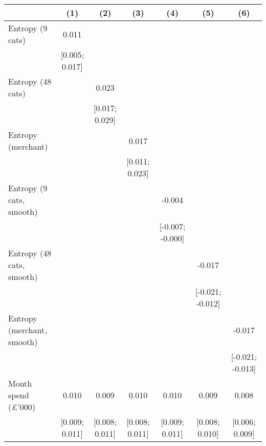 
\begingroup
\centering
\begin{tabular}{lcccccc}
   \toprule
                               & (1)            & (2)            & (3)            & (4)              & (5)              & (6)\\  
   \midrule 
   Entropy (9 cats)            & 0.011          &                &                &                  &                  &   \\   
                               & [0.005; 0.017] &                &                &                  &                  &   \\   
   Entropy (48 cats)           &                & 0.023          &                &                  &                  &   \\   
                               &                & [0.017; 0.029] &                &                  &                  &   \\   
   Entropy (merchant)          &                &                & 0.017          &                  &                  &   \\   
                               &                &                & [0.011; 0.023] &                  &                  &   \\   
   Entropy (9 cats, smooth)    &                &                &                & -0.004           &                  &   \\   
                               &                &                &                & [-0.007; -0.000] &                  &   \\   
   Entropy (48 cats, smooth)   &                &                &                &                  & -0.017           &   \\   
                               &                &                &                &                  & [-0.021; -0.012] &   \\   
   Entropy (merchant, smooth)  &                &                &                &                  &                  & -0.017\\   
                               &                &                &                &                  &                  & [-0.021; -0.013]\\   
   Month spend (\pounds'000)   & 0.010          & 0.009          & 0.010          & 0.010            & 0.009            & 0.008\\   
                               & [0.009; 0.011] & [0.008; 0.011] & [0.008; 0.011] & [0.009; 0.011]   & [0.008; 0.010]   & [0.006; 0.009]\\   

\end{tabular}
